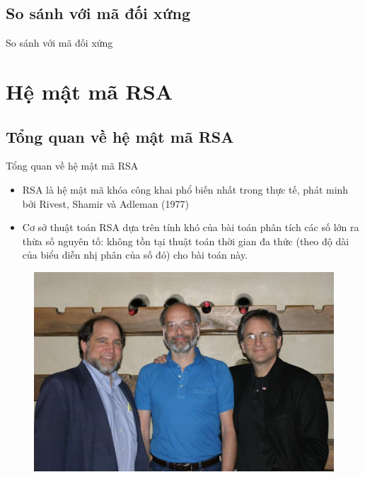 \documentclass{beamer}
\begin{document}
\subsection{So sánh với mã đối xứng}
\begin{frame}{So sánh với mã đối xứng}

\end{frame}
\section{Hệ mật mã RSA}
\subsection{Tổng quan về hệ mật mã RSA}
\begin{frame}{Tổng quan về hệ mật mã RSA}

\begin{itemize}
\item RSA là hệ mật mã khóa công khai phổ biến nhất trong thực tế, phát minh bởi Rivest, Shamir và Adleman (1977)
\item Cơ sở thuật toán RSA dựa trên tính khó của bài toán phân tích các số lớn ra thừa số nguyên tố: không tồn tại thuật toán thời gian đa thức (theo độ dài của biểu diễn nhị phân của số đó) cho bài toán này.
\end{itemize}

\begin{figure}[H]
\centering
\includegraphics[scale = 0.4]{pictures/RSA_RonRivestAdiShamirLeonardAdleman.png}
\end{figure}

\end{frame}
\end{document}
